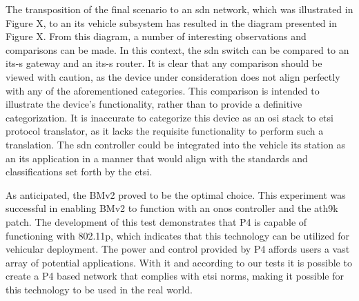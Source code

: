 The transposition of the final scenario to an \gls{sdn} network, which was illustrated in Figure X, to an \gls{its} vehicle subsystem has resulted in the diagram presented in Figure X. From this diagram, a number of interesting observations and comparisons can be made. 
In this context, the \gls{sdn} switch can be compared to an \gls{its-s} gateway and an \gls{its-s} router. It is clear that any comparison should be viewed with caution, as the device under consideration does not align perfectly with any of the aforementioned categories. This comparison is intended to illustrate the device's functionality, rather than to provide a definitive categorization. It is inaccurate to categorize this device as an \gls{osi} stack to \gls{etsi} protocol translator, as it lacks the requisite functionality to perform such a translation.
The \gls{sdn} controller could be integrated into the vehicle \gls{its} station as an \gls{its} application in a manner that would align with the standards and classifications set forth by the \gls{etsi}.

As anticipated, the BMv2 proved to be the optimal choice. This experiment was successful in enabling BMv2 to function with an \gls{onos} controller and the ath9k patch. The development of this test demonstrates that P4 is capable of functioning with 802.11p, which indicates that this technology can be utilized for vehicular deployment. The power and control provided by P4 affords users a vast array of potential applications. With it and according to our tests it is possible to create a P4 based network that complies with \gls{etsi} norms, making it possible for this technology to be used in the real world.

